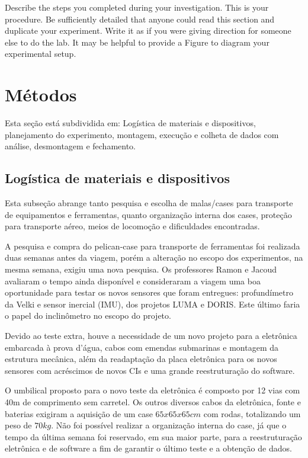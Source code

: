 
Describe the steps you completed during your investigation. This is your procedure. Be sufficiently detailed that anyone could read this section and duplicate your experiment. Write it as if you were giving direction for someone else to do the lab. It may be helpful to provide a Figure to diagram your experimental setup.


\section{Métodos}
Esta seção está subdividida em: Logística de materiais e dispositivos,
planejamento do experimento, montagem, execução e colheta de dados com análise,
desmontagem e fechamento.

\subsection{Logística de materiais e dispositivos}
Esta subseção abrange tanto pesquisa e escolha de malas/cases para
transporte de equipamentos e ferramentas, quanto organização interna dos
cases, proteção para transporte aéreo, meios de locomoção e dificuldades
encontradas.

A pesquisa e compra do pelican-case para transporte de ferramentas foi
realizada duas semanas antes da viagem, porém a alteração no escopo dos experimentos, na mesma
semana, exigiu uma nova pesquisa. Os professores Ramon e Jacoud avaliaram o
tempo ainda disponível e consideraram a viagem uma boa oportunidade para testar
os novos sensores que foram entregues:
profundímetro da Velki e sensor inercial (IMU), dos projetos LUMA e DORIS. Este
último faria o papel do inclinômetro no escopo do projeto. 

Devido ao teste extra, houve a necessidade de um novo projeto para a eletrônica
embarcada à prova d'água, cabos com emendas submarinas e montagem da estrutura mecânica, além da readaptação da placa eletrônica para os novos sensores com acréscimos de novos
CIs e uma grande reestruturação do software. 

O umbilical proposto para o novo teste da eletrônica é composto por 12 vias com
40m de comprimento sem carretel. Os outros diversos cabos da eletrônica, fonte e
baterias exigiram a aquisição de um case $65x65x65 cm$ com rodas, totalizando um
peso de $70kg$. Não foi possível realizar a organização interna do case, já que
o tempo da última semana foi reservado, em sua maior parte, para a
reestruturação eletrônica e de software a fim de garantir o último teste e a
obtenção de dados.

 

\label{metodos}


